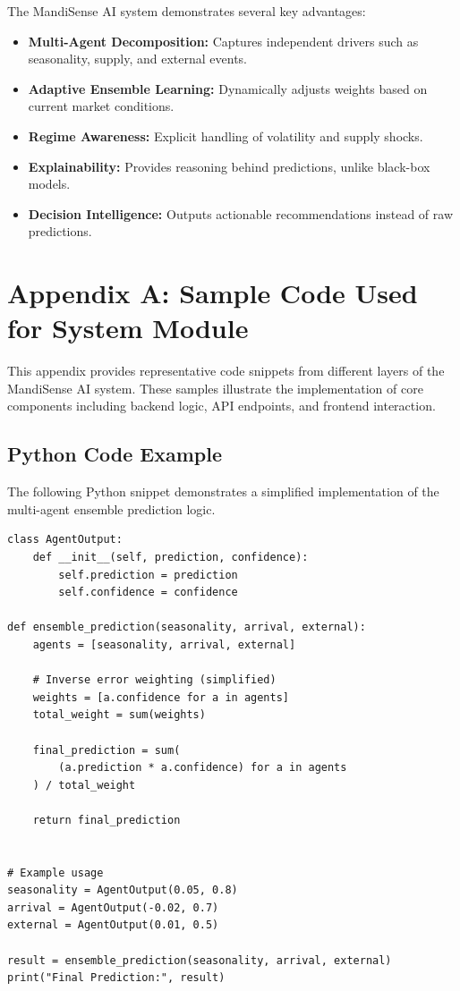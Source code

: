 \documentclass[12pt,a4paper]{report}
\begin{document}
The MandiSense AI system demonstrates several key advantages:

\begin{itemize}
    \item \textbf{Multi-Agent Decomposition:} Captures independent drivers such as seasonality, supply, and external events.
    \item \textbf{Adaptive Ensemble Learning:} Dynamically adjusts weights based on current market conditions.
    \item \textbf{Regime Awareness:} Explicit handling of volatility and supply shocks.
    \item \textbf{Explainability:} Provides reasoning behind predictions, unlike black-box models.
    \item \textbf{Decision Intelligence:} Outputs actionable recommendations instead of raw predictions.
\end{itemize}

\chapter{Appendix A: Sample Code Used for System Module}

This appendix provides representative code snippets from different layers of the MandiSense AI system. These samples illustrate the implementation of core components including backend logic, API endpoints, and frontend interaction.

\section{Python Code Example}

The following Python snippet demonstrates a simplified implementation of the multi-agent ensemble prediction logic.

\begin{verbatim}
class AgentOutput:
    def __init__(self, prediction, confidence):
        self.prediction = prediction
        self.confidence = confidence

def ensemble_prediction(seasonality, arrival, external):
    agents = [seasonality, arrival, external]

    # Inverse error weighting (simplified)
    weights = [a.confidence for a in agents]
    total_weight = sum(weights)

    final_prediction = sum(
        (a.prediction * a.confidence) for a in agents
    ) / total_weight

    return final_prediction


# Example usage
seasonality = AgentOutput(0.05, 0.8)
arrival = AgentOutput(-0.02, 0.7)
external = AgentOutput(0.01, 0.5)

result = ensemble_prediction(seasonality, arrival, external)
print("Final Prediction:", result)
\end{verbatim}
\end{document}
